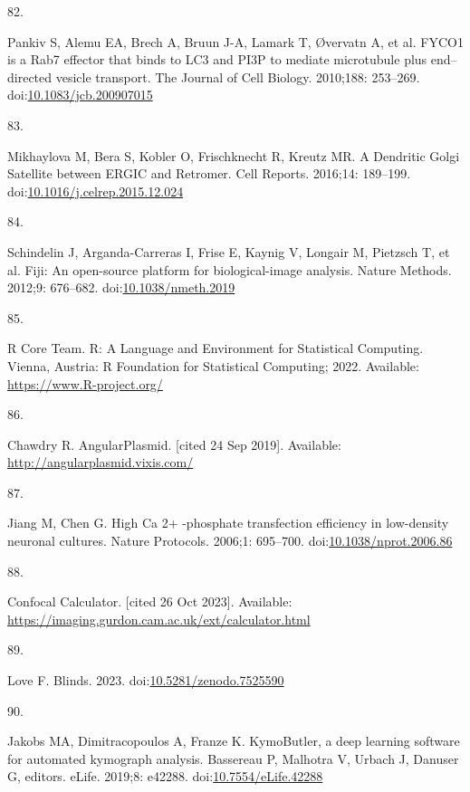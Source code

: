 \documentclass[
  12pt,
  a4paper,
]{book}
\newlength{\cslhangindent}
\newlength{\csllabelwidth}
\newenvironment{CSLReferences}[2] %
 {\begin{list}{}{%
  \setlength{\itemindent}{0pt}
  \setlength{\leftmargin}{0pt}
  \setlength{\parsep}{0pt}
  \ifodd #1
   \setlength{\leftmargin}{\cslhangindent}
   \setlength{\itemindent}{-1\cslhangindent}
  \fi
  \setlength{\itemsep}{#2\baselineskip}}}
 {\end{list}}
\newcommand{\CSLLeftMargin}[1]{\parbox[t]{\csllabelwidth}{\strut#1\strut}}
\newcommand{\CSLRightInline}[1]{\parbox[t]{\linewidth - \csllabelwidth}{\strut#1\strut}}
\begin{document}
\begin{CSLReferences}{0}{1}
\CSLLeftMargin{82. }%
\CSLRightInline{Pankiv S, Alemu EA, Brech A, Bruun J-A, Lamark T, Øvervatn A, et al. {FYCO1} is a {Rab7} effector that binds to {LC3} and {PI3P} to mediate microtubule plus end--directed vesicle transport. The Journal of Cell Biology. 2010;188: 253--269. doi:\href{https://doi.org/10.1083/jcb.200907015}{10.1083/jcb.200907015}}

\CSLLeftMargin{83. }%
\CSLRightInline{Mikhaylova M, Bera S, Kobler O, Frischknecht R, Kreutz MR. A {Dendritic Golgi Satellite} between {ERGIC} and {Retromer}. Cell Reports. 2016;14: 189--199. doi:\href{https://doi.org/10.1016/j.celrep.2015.12.024}{10.1016/j.celrep.2015.12.024}}

\CSLLeftMargin{84. }%
\CSLRightInline{Schindelin J, Arganda-Carreras I, Frise E, Kaynig V, Longair M, Pietzsch T, et al. Fiji: An open-source platform for biological-image analysis. Nature Methods. 2012;9: 676--682. doi:\href{https://doi.org/10.1038/nmeth.2019}{10.1038/nmeth.2019}}

\CSLLeftMargin{85. }%
\CSLRightInline{R Core Team. R: {A Language} and {Environment} for {Statistical Computing}. {Vienna, Austria}: {R Foundation for Statistical Computing}; 2022. Available: \url{https://www.R-project.org/}}

\CSLLeftMargin{86. }%
\CSLRightInline{Chawdry R. {AngularPlasmid}. {[}cited 24 Sep 2019{]}. Available: \url{http://angularplasmid.vixis.com/}}

\CSLLeftMargin{87. }%
\CSLRightInline{Jiang M, Chen G. High {Ca} 2+ -phosphate transfection efficiency in low-density neuronal cultures. Nature Protocols. 2006;1: 695--700. doi:\href{https://doi.org/10.1038/nprot.2006.86}{10.1038/nprot.2006.86}}

\CSLLeftMargin{88. }%
\CSLRightInline{Confocal {Calculator}. {[}cited 26 Oct 2023{]}. Available: \url{https://imaging.gurdon.cam.ac.uk/ext/calculator.html}}

\CSLLeftMargin{89. }%
\CSLRightInline{Love F. Blinds. 2023. doi:\href{https://doi.org/10.5281/zenodo.7525590}{10.5281/zenodo.7525590}}

\CSLLeftMargin{90. }%
\CSLRightInline{Jakobs MA, Dimitracopoulos A, Franze K. {KymoButler}, a deep learning software for automated kymograph analysis. Bassereau P, Malhotra V, Urbach J, Danuser G, editors. eLife. 2019;8: e42288. doi:\href{https://doi.org/10.7554/eLife.42288}{10.7554/eLife.42288}}


\end{CSLReferences}
\end{document}

